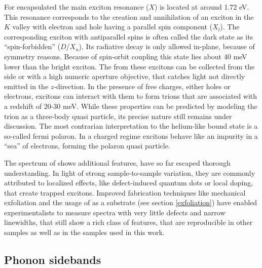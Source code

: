 For \hbng encapsulated \wse the main exciton resonance ($X$) is located at around 1.72 eV. This resonance corresponds to the creation and annihilation of an exciton in the $K$ valley with electron and hole having a parallel spin component ($X_l$). The corresponding exciton with antiparallel spins is often called the dark state as its ``spin-forbidden'' ($D$/$X_u$). Its radiative decay is only allowed in-plane, because of symmetry reasons\texttrademark. Because of spin-orbit coupling this state lies about 40 meV lower than the bright exciton\cite{echeverry_splitting_2016}. The \pl from these excitons can be collected from the side or with a high numeric aperture objective, that catches light not directly emitted in the $z$-direction\cite{robert_fine_2017, wang_-plane_2017}. In the presence of free charges, either holes or electrons, excitons can interact with them to form trions that are associated with a redshift of 20-30 meV\cite{courtade_charged_2017}. While these properties can be predicted by modeling the trion as a three-body quasi particle, its precise nature still remains under discussion. The most contrarian interpretation to the helium-like bound state is a so-called fermi polaron. In a charged regime excitons behave like an impurity in a ``sea'' of electrons, forming the polaron quasi particle\cite{sidler_fermi_2016, efimkin_many-body_2017,schmidt_fermi_2012}.

The spectrum of \wse shows additional features, have so far escaped thorough understanding. In light of strong sample-to-sample variation, they are commonly attributed to localized effects, like defect-induced quantum dots or local doping\cite{kato_optical_2014, zhang_defect_2017}, that create trapped excitons. Improved fabrication techniques like mechanical exfoliation and the usage of \hbng as a substrate (see section \ref{exfoliation}) have enabled experimentalists to measure spectra with very little defects and narrow linewidths, that still show a rich class of features, that are reproducible in other samples as well as in the samples used in this work.

\subsection{Phonon sidebands}\label{sidebands}

